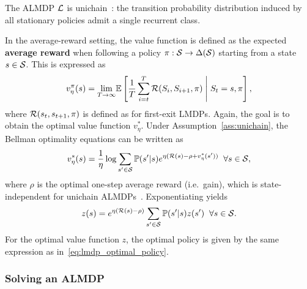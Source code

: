 \begin{assumption}
  The ALMDP $\mathcal{L}$ is unichain~\citep{Puterman1994}: the transition probability distribution induced by all stationary policies admit a single recurrent class.
  \label{ass:unichain}
\end{assumption}

In the average-reward setting, the value function is defined as the expected \textbf{average reward} when following a policy $\pi:\mathcal{S}\rightarrow\Delta(\mathcal{S})$ starting from a state $s\in\mathcal{S}$. This is expressed as
\begin{equation}
  v_\eta^\pi(s) = \underset{T\rightarrow\infty}\lim \mathbb{E}\left[\frac{1}{T} \sum_{i=t}^T \mathcal{R}(S_i, S_{i+1}, \pi)\;\middle\lvert\;S_t = s, \pi\right],
  \label{eq:value_function_almdp}
\end{equation}
where $\mathcal{R}(s_t, s_{t+1}, \pi)$ is defined as for first-exit LMDPs.
Again, the goal is to obtain the optimal value function $v^*_\eta$. Under Assumption~\ref{ass:unichain}, the Bellman optimality equations can be written as
\begin{equation}
  v^*_\eta(s) = \frac 1 \eta \log{\sum_{s'\in\mathcal{S}}\mathbb{P}(s'\lvert s)e^{\eta(\mathcal{R}(s) - \rho + v^*_\eta(s'))}} \;\;\forall s\in\mathcal{S},
  \label{eq:boe_almdp}
\end{equation}
where $\rho$ is the optimal one-step average reward (i.e.~gain), which is state-independent for unichain ALMDPs~\citep{Todorov2006}. Exponentiating yields
\begin{equation}
  z(s) = e^{\eta(\mathcal{R}(s) - \rho)} \sum_{s'\in\mathcal{S}}\mathbb{P}(s'\lvert s)z(s') \;\;\forall s\in\mathcal{S}.
  \label{eq:boe_z_almdp}
\end{equation}
For the optimal value function $z$, the optimal policy is given by the same expression as in~\eqref{eq:lmdp_optimal_policy}.

\subsubsection{Solving an ALMDP}

